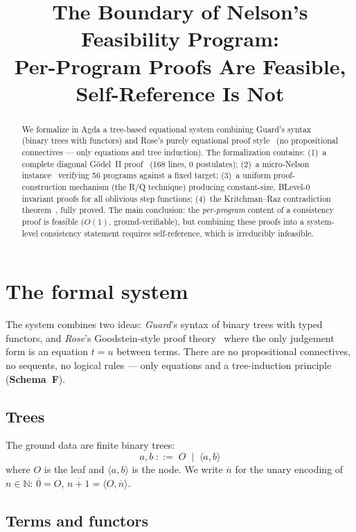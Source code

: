 \documentclass[11pt]{article}
\title{The Boundary of Nelson's Feasibility Program:\\
  Per-Program Proofs Are Feasible,\\
  Self-Reference Is Not}
\author{}
\date{}
\newcommand{\pair}[2]{\langle #1, #2 \rangle}
\newcommand{\SchemaF}{\textbf{Schema~F}}
\newcommand{\nat}[1]{\overline{#1}}
\begin{document}
\maketitle

\begin{abstract}
We formalize in Agda a tree-based equational system combining
Guard's syntax (binary trees with functors) and Rose's
purely equational proof style~\cite{rose1953} (no propositional
connectives --- only equations and tree induction).
The formalization contains:
(1)~a complete diagonal G\"odel~II proof~\cite{godel1931}
(168 lines, 0 postulates);
(2)~a micro-Nelson instance~\cite{nelson1986} verifying 56
programs against a fixed target;
(3)~a uniform proof-construction mechanism (the R/Q technique)
producing constant-size, BLevel-0 invariant proofs for all
oblivious step functions;
(4)~the Kritchman--Raz contradiction theorem~\cite{kritchmanraz2010},
fully proved.
The main conclusion: the \emph{per-program} content of a consistency
proof is feasible ($O(1)$, ground-verifiable), but combining these
proofs into a system-level consistency statement requires
self-reference, which is irreducibly infeasible.
\end{abstract}

\section{The formal system}

The system combines two ideas: \emph{Guard}'s syntax of binary trees
with typed functors, and \emph{Rose}'s Goodstein-style proof
theory~\cite{rose1953} where the only judgement form is an equation
$t = u$ between terms.  There are no propositional connectives,
no sequents, no logical rules --- only equations and a tree-induction
principle (\SchemaF).

\subsection*{Trees}

The ground data are finite binary trees:
\[
  a, b \;::=\; O \;\mid\; \pair{a}{b}
\]
where $O$ is the leaf and $\pair{a}{b}$ is the node.
We write $\nat{n}$ for the unary encoding of $n \in \mathbb{N}$:
$\nat{0} = O$, $\nat{n+1} = \pair{O}{\nat{n}}$.

\subsection*{Terms and functors}
\end{document}
